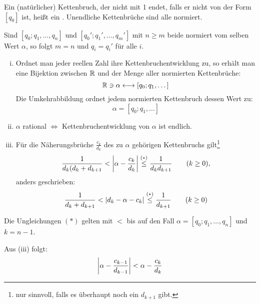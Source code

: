 \begin{defn}
	Ein (natürlicher) Kettenbruch, der nicht mit 1 endet, falls er nicht von der Form $[q_0]$ ist, heißt ein . Unendliche Kettenbrüche sind alle normiert.
\end{defn}

	Sind $[q_0;q_1,\dots,q_n]$ und $[q_0';q_1',\dots,q_m']$ mit $n \geq m$ beide normiert vom selben Wert $\alpha$, so folgt $m = n$ und $q_i = q_i'$ für alle $i$.
	
\begin{satz} \label{satz_2.2}
	\begin{enumerate}[(i)]
		\item Ordnet man jeder reellen Zahl ihre Kettenbruchentwicklung zu, so erhält man eine Bijektion zwischen $\RR$ und der Menge aller normierten Kettenbrüche:
		\begin{equation}
			\RR \ni \alpha \longleftrightarrow [q_0;q_1,\dots] \label{eq_2.35}
		\end{equation}
		Die Umkehrabbildung ordnet jedem normierten Kettenbruch dessen Wert zu:
		\[ \alpha = [q_0;q_1,\dots] \]
		\item $\alpha$ rational $\Leftrightarrow$ Kettenbruchentwicklung von $\alpha$ ist endlich.
		\item Für die Näherungsbrüche $\frac{c_k}{d_k}$ des zu $\alpha$ gehörigen Kettenbruchs gilt\footnote{nur sinnvoll, falls es überhaupt noch ein $d_{k+1}$ gibt.}
		\begin{equation}
			\frac{1}{d_k(d_k+d_{k+1}} < \abs*{\alpha - \frac{c_k}{d_k}} \stackrel{(*)}{\leq} \frac{1}{d_k d_{k+1}} \qquad (k \geq 0), \label{eq_2.36}
		\end{equation}
		anders geschrieben:
		\begin{equation}
			\frac{1}{d_k + d_{k+1}} < \abs{d_k-\alpha - c_k} \stackrel{(*)}{\leq} \frac{1}{d_{k+1}} \qquad (k \geq 0) \label{eq_2.37}
		\end{equation}
	\end{enumerate}
\end{satz}

	Die Ungleichungen $(*)$ gelten mit $<$ bis auf den Fall $\alpha = [q_0;q_1,\dots,q_n]$ und $k = n-1$.

	Aus (iii) folgt:
	\begin{equation}
		\abs*{ \alpha - \frac{c_{k-1}}{d_{k-1}}} < \alpha - \frac{c_k}{d_k} \label{eq_2.44}
	\end{equation}
	
